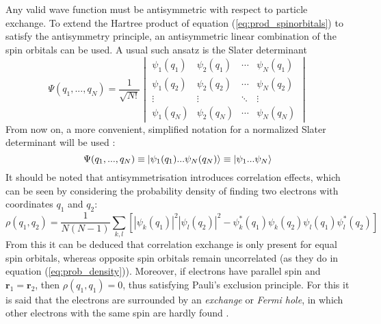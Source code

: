 Any valid wave function must be antisymmetric with respect to particle exchange. To extend the Hartree product of equation (\ref{eq:prod_spinorbitals}) to satisfy the antisymmetry principle, an antisymmetric linear combination of the spin orbitals can be used. A usual such ansatz is the Slater determinant
\begin{equation}
	\Psi (q_1,...,q_N)= \frac{1}{\sqrt{N!}}
	\begin{vmatrix}
  \psi_1 (q_1) & \psi_2 (q_1) & \cdots & \psi_N (q_1)\\
  \psi_1 (q_2) & \psi_2 (q_2) & \cdots & \psi_N (q_2)\\
  \vdots & \vdots & \ddots & \vdots \\
  \psi_1 (q_N) & \psi_2 (q_N) & \cdots & \psi_N (q_N)
\end{vmatrix}
\end{equation}
From now on, a more convenient, simplified notation for a normalized Slater determinant will be used \cite{szabo}:
\begin{equation}
		\Psi (q_1,...,q_N) \equiv \ket{\psi_1(q_1)... \psi_N(q_N)}\equiv\ket{\psi_1... \psi_N}
\end{equation}
It should be noted that antisymmetrisation introduces correlation effects, which can be seen by considering the probability density of finding two electrons with coordinates $q_1$ and $q_2$:
\begin{equation}
	\rho(q_1, q_2) = \frac{1}{N(N-1)}	\sum_{k,l}\left[\left|\psi_k(q_1)\right|^2\left|	\psi_l(q_2)\right|^2-\psi_k^*(q_1) 	\psi_k(q_2) \psi_l(q_1) \psi_l^*(q_2)\right]
	\label{eq:correlated_prob}
\end{equation}
From this it can be deduced that correlation exchange is only present for equal spin orbitals, whereas opposite spin orbitals remain uncorrelated (as they do in equation (\ref{eq:prob_density})). Moreover, if electrons have parallel spin and $\mathbf{r}_1= \mathbf{r}_2$, then $\rho(q_1, q_1)=0$, thus satisfying Pauli's exclusion principle. %
For this it is said that the electrons are surrounded by an \emph{exchange} or \emph{Fermi hole}, in which other electrons with the same spin are hardly found \cite{szabo,computationalphysics,slater1}.
